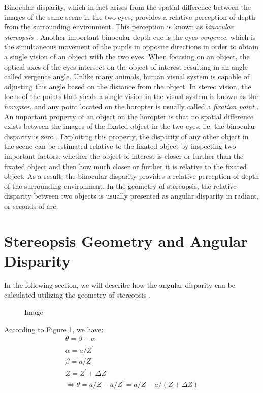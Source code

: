 \documentclass[12pt]{report}
\begin{document}
Binocular disparity, which in fact arises from the spatial difference 
between the images of the same scene in the two eyes, provides a relative perception of depth from the surrounding environment. This perception is known as {\it binocular stereopsis} \cite{how95}. 
Another important binocular depth cue is the eyes {\it vergence}, which is the simultaneous movement of the pupils in opposite directions in order to obtain a single vision of an object with the
two eyes. When focusing on an object, the optical axes of the eyes intersect on the object of interest resulting in an angle called vergence angle. Unlike many animals, human visual system 
is capable of adjusting this angle based on the distance from the object.
In stereo vision, the locus of the points that yields a single vision in the visual system is known as the {\it horopter}, and any point located on the horopter is usually called a 
{\it fixation point} \cite{binr83,how95}.
An important property of an object on the horopter is that no spatial difference
exists between the images of the fixated object in the two eyes; i.e. the binocular disparity is zero \cite{how95}. 
Exploiting this property, the disparity of any other object in the scene can be estimated relative to the fixated object by inspecting two important factors: 
whether the object of interest is closer or further than the fixated object and then how much closer or further it is relative to the fixated object.
As a result, the binocular disparity provides a relative perception of depth of the surrounding environment.
In the geometry of stereopsis, the relative disparity between two objects is usually presented as angular disparity in radiant, or seconds of arc.

\section{Stereopsis Geometry and Angular Disparity}

In the following section, we will describe how the angular disparity can be calculated utilizing the geometry of stereopsis \cite{binr83}.

\begin{figure}[h!]
\centering

\caption{Image}
\label{fig:stereopsis}
\end{figure} 

According to Figure \ref{fig:stereopsis}, we have:
\begin{align}
\theta = \beta - \alpha\\
\alpha = a/Z^{'}\\
\beta = a/Z\\
Z = Z^{'} + \Delta Z\\
\Rightarrow \theta = a/Z - a/Z^{'} = a/Z - a/(Z+\Delta Z)
\end{align}
\end{document}
